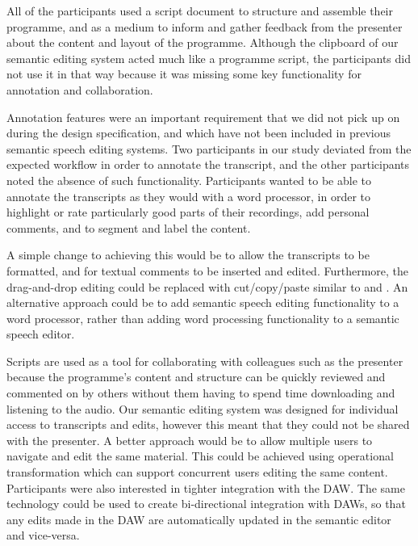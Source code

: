 All of the participants used a script document to structure and assemble their programme, and as a
medium to inform and gather feedback from the presenter about the content and layout of the programme. Although the
clipboard of our semantic editing system acted much like a programme script, the participants did not use it in that
way because it was missing some key functionality for annotation and collaboration.

Annotation features were an important requirement that we did not pick up on during the design specification, and which
have not been included in previous semantic speech editing systems. Two participants in our study deviated from the
expected workflow in order to annotate the transcript, and the other participants noted the absence of such
functionality. Participants wanted to be able to annotate the transcripts as they would with a word processor, in order
to highlight or rate particularly good parts of their recordings, add personal comments, and to segment and label the
content.

A simple change to achieving this would be to allow the transcripts to be formatted, and for textual comments to be
inserted and edited. Furthermore, the drag-and-drop editing could be replaced with cut/copy/paste similar to
\citet{Whittaker2004} and \citet{Rubin2013}. An alternative approach could be to add semantic speech editing
functionality to a word processor, rather than adding word processing functionality to a semantic speech editor.

Scripts are used as a tool for collaborating with colleagues such as the
presenter because the programme's content and structure can be quickly reviewed and
commented on by others without them having to spend time downloading and listening to the audio. Our semantic editing
system was designed for individual access to transcripts and edits, however this meant that they could not be shared
with the presenter. A better approach would be to allow multiple users to navigate and edit the same material. This
could be achieved using operational transformation \citep{Sun2004} which can support concurrent users editing the same
content. Participants were also interested in tighter integration with the DAW. The same technology could be used
to create bi-directional integration with DAWs, so that any edits made in the DAW are automatically updated in the
semantic editor and vice-versa.

